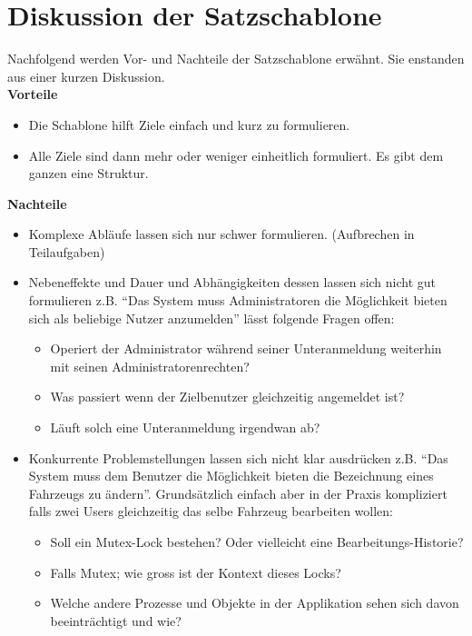 \section{Diskussion der Satzschablone}
Nachfolgend werden Vor- und Nachteile der Satzschablone erwähnt. Sie enstanden aus einer kurzen Diskussion.\\[2ex]
\textbf{Vorteile}
\begin{itemize}
\item Die Schablone hilft Ziele einfach und kurz zu formulieren.
\item Alle Ziele sind dann mehr oder weniger einheitlich formuliert. Es gibt dem ganzen eine Struktur.
\end{itemize}
%
\textbf{Nachteile}
\begin{itemize}
\item Komplexe Abläufe lassen sich nur schwer formulieren. (Aufbrechen in Teilaufgaben)
\item Nebeneffekte und Dauer und Abhängigkeiten dessen lassen sich nicht gut formulieren z.B. ``Das System muss Administratoren die Möglichkeit bieten sich als beliebige Nutzer anzumelden'' lässt folgende Fragen offen:
    \begin{itemize}
    \item Operiert der Administrator während seiner Unteranmeldung weiterhin mit seinen Administratorenrechten?
    \item Was passiert wenn der Zielbenutzer gleichzeitig angemeldet ist?
    \item Läuft solch eine Unteranmeldung irgendwan ab?
    \end{itemize}
\item Konkurrente Problemstellungen lassen sich nicht klar ausdrücken z.B. ``Das System muss dem Benutzer die Möglichkeit bieten die Bezeichnung eines Fahrzeugs zu ändern''. Grundsätzlich einfach aber in der Praxis kompliziert falls zwei Users gleichzeitig das selbe Fahrzeug bearbeiten wollen:
    \begin{itemize}
    \item Soll ein Mutex-Lock bestehen? Oder vielleicht eine Bearbeitungs-Historie?
    \item Falls Mutex; wie gross ist der Kontext dieses Locks? 
    \item Welche andere Prozesse und Objekte in der Applikation sehen sich davon beeinträchtigt und wie?
    \end{itemize}
\end{itemize}
